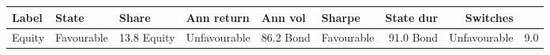 \begin{tabular}{llllllrr}
\toprule
Label & State & Share & Ann return & Ann vol & Sharpe & State dur & Switches \\
\midrule
Equity & Favourable & 13.8%
Equity & Unfavourable & 86.2%
Bond & Favourable & 91.0%
Bond & Unfavourable & 9.0%
\bottomrule
\end{tabular}
